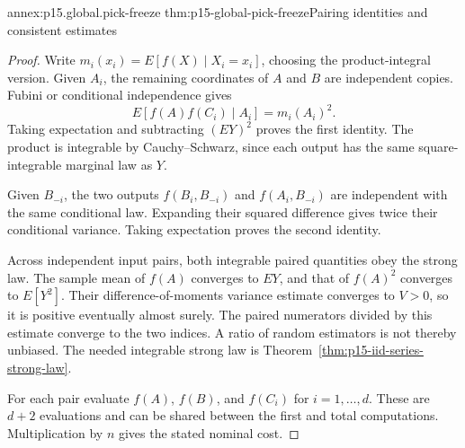 \begin{annexitem}{annex:p15.global.pick-freeze}
 {thm:p15-global-pick-freeze}{Pairing identities and consistent estimates}
\begin{proof}
Write \(m_i(x_i)=E[f(X)\mid X_i=x_i]\), choosing the product-integral
version. Given \(A_i\), the remaining coordinates of \(A\) and \(B\)
are independent copies. Fubini or conditional independence gives
\[
 E[f(A)f(C_i)\mid A_i]=m_i(A_i)^2.
\]
Taking expectation and subtracting \((EY)^2\) proves the first identity.
The product is integrable by Cauchy--Schwarz, since each output has
the same square-integrable marginal law as \(Y\).

Given \(B_{-i}\), the two outputs \(f(B_i,B_{-i})\) and
\(f(A_i,B_{-i})\) are independent with the same conditional law.
Expanding their squared difference gives twice their conditional variance.
Taking expectation proves the second identity.

Across independent input pairs, both integrable paired quantities obey
the strong law. The sample mean of \(f(A)\) converges to \(EY\), and
that of \(f(A)^2\) converges to \(E[Y^2]\). Their difference-of-moments
variance estimate converges to \(V>0\), so it is positive eventually
almost surely. The paired numerators divided by this estimate converge
to the two indices. A ratio of random estimators is not thereby unbiased.
The needed integrable strong law is
Theorem~\ref{thm:p15-iid-series-strong-law}.

For each pair evaluate \(f(A)\), \(f(B)\), and \(f(C_i)\) for
\(i=1,\ldots,d\). These are \(d+2\) evaluations and can be shared
between the first and total computations. Multiplication by \(n\)
gives the stated nominal cost.
\end{proof}
\end{annexitem}

